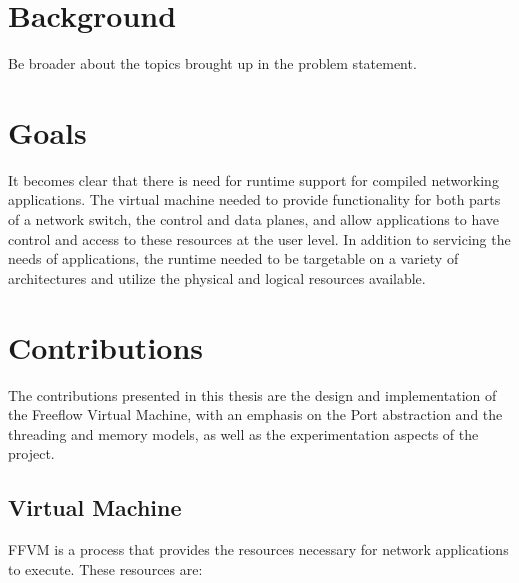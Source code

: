
\section{Background}
Be broader about the topics brought up in the problem statement.

\section{Goals}
It becomes clear that there is need for runtime support for compiled
networking applications. The virtual machine needed to provide functionality
for both parts of a network switch, the control and data planes, and allow
applications to have control and access to these resources at the user level.
In addition to servicing the needs of applications, the runtime needed to be
targetable on a variety of architectures and utilize the physical and logical
resources available.

\section{Contributions}
The contributions presented in this thesis are the design and implementation of
the Freeflow Virtual Machine, with an emphasis on the Port abstraction and the
threading and memory models, as well as the experimentation aspects of the
project.

\subsection{Virtual Machine}
FFVM is a process that provides the resources necessary for network
applications to execute. These resources are:

